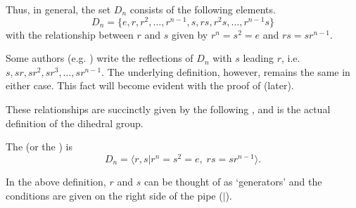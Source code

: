 Thus, in general, the set $D_n$ consists of the following elements.
\[
    D_n = \{e, r, r^2, \dots, r^{n-1}, s, rs, r^2s, \dots, r^{n-1}s\}
\]
with the relationship between $r$ and $s$ given by $r^n = s^2 = e$ and $rs = sr^{n-1}$.

\begin{remark}
    Some authors (e.g. {\cite[p.~25]{dummit_foote_2004}}) write the reflections of $D_n$ with $s$ leading $r$, i.e. $s, sr, sr^2, sr^3, \dots, sr^{n-1}$. The underlying definition, however, remains the same in either case. This fact will become evident with the proof of  (later).
\end{remark}

These relationships are succinctly given by the following , and is the actual definition of the dihedral group.
\begin{definition}
    The  (or the ) is
    \[
        D_n = \langle r, s \vert r^n = s^2 = e,\;rs = sr^{n-1} \rangle.
    \]
\end{definition}
\begin{remark}
    In the above definition, $r$ and $s$ can be thought of as `generators' and the conditions are given on the right side of the pipe ($|$).
\end{remark}

